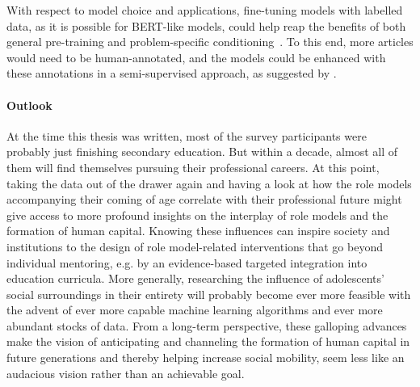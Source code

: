 With respect to model choice and applications, fine-tuning models with labelled data, as it is possible for BERT-like models, could help reap the benefits of both general pre-training and problem-specific conditioning~\autocite{devlin_bert_2019}. To this end, more articles would need to be human-annotated, and the models could be enhanced with these annotations in a semi-supervised approach, as suggested by \textcite{fenske_using_2022}.


\paragraph{Outlook}
At the time this thesis was written, most of the survey participants were probably just finishing secondary education. But within a decade, almost all of them will find themselves pursuing their professional careers. At this point, taking the data out of the drawer again and having a look at how the role models accompanying their coming of age correlate with their professional future might give access to more profound insights on the interplay of role models and the formation of human capital. Knowing these influences can inspire society and institutions to the design of role model-related interventions that go beyond individual mentoring, e.g. by an evidence-based targeted integration into education curricula. More generally, researching the influence of adolescents' social surroundings in their entirety will probably become ever more feasible with the advent of ever more capable machine learning algorithms and ever more abundant stocks of data. From a long-term perspective, these galloping advances make the vision of anticipating and channeling the formation of human capital in future generations and thereby helping increase social mobility, seem less like an audacious vision rather than an achievable goal.